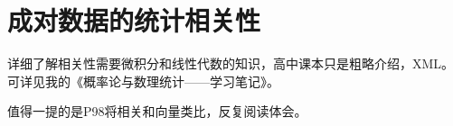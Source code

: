 \section{成对数据的统计相关性}

详细了解相关性需要微积分和线性代数的知识，高中课本只是粗略介绍，XML。可详见我的《概率论与数理统计——学习笔记》。

值得一提的是P98将相关和向量类比，反复阅读体会。




